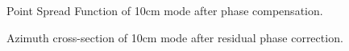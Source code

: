 \begin{figure}[ht!]
\begin{center}
 \caption{Point Spread Function of 10cm mode after phase compensation.}
 \label{fg:10cmPSFBalanced}
 \end{center}
\end{figure}
\begin{figure}[ht!]
\begin{center}
 \caption{Azimuth cross-section of 10cm mode after residual phase correction.}
 \label{fg:azimuthCross10}
 \end{center}
\end{figure}
